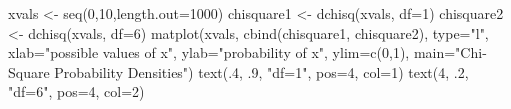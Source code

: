 \begin{Schunk}
\begin{Sinput}
 xvals <- seq(0,10,length.out=1000)
 chisquare1 <- dchisq(xvals, df=1)
 chisquare2 <- dchisq(xvals, df=6)
 matplot(xvals, cbind(chisquare1, chisquare2), type="l", xlab="possible values of x", ylab="probability of x",  ylim=c(0,1), main="Chi-Square Probability Densities")
 text(.4, .9, "df=1", pos=4, col=1)
 text(4, .2, "df=6", pos=4, col=2)
\end{Sinput}
\end{Schunk}
